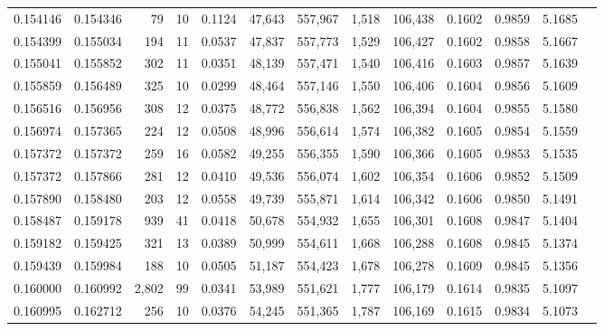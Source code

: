 \begin{tabular}{rrrrrrrrrrrrr}
0.154146 & 0.154346 &    79 &  10 &                                     0.1124 &  47,643 & 557,967 &   1,518 & 106,438 & 0.1602 & 0.9859 & 5.1685 \\
0.154399 & 0.155034 &   194 &  11 &                                     0.0537 &  47,837 & 557,773 &   1,529 & 106,427 & 0.1602 & 0.9858 & 5.1667 \\
0.155041 & 0.155852 &   302 &  11 &                                     0.0351 &  48,139 & 557,471 &   1,540 & 106,416 & 0.1603 & 0.9857 & 5.1639 \\
0.155859 & 0.156489 &   325 &  10 &                                     0.0299 &  48,464 & 557,146 &   1,550 & 106,406 & 0.1604 & 0.9856 & 5.1609 \\
0.156516 & 0.156956 &   308 &  12 &                                     0.0375 &  48,772 & 556,838 &   1,562 & 106,394 & 0.1604 & 0.9855 & 5.1580 \\
0.156974 & 0.157365 &   224 &  12 &                                     0.0508 &  48,996 & 556,614 &   1,574 & 106,382 & 0.1605 & 0.9854 & 5.1559 \\
0.157372 & 0.157372 &   259 &  16 &                                     0.0582 &  49,255 & 556,355 &   1,590 & 106,366 & 0.1605 & 0.9853 & 5.1535 \\
0.157372 & 0.157866 &   281 &  12 &                                     0.0410 &  49,536 & 556,074 &   1,602 & 106,354 & 0.1606 & 0.9852 & 5.1509 \\
0.157890 & 0.158480 &   203 &  12 &                                     0.0558 &  49,739 & 555,871 &   1,614 & 106,342 & 0.1606 & 0.9850 & 5.1491 \\
0.158487 & 0.159178 &   939 &  41 &                                     0.0418 &  50,678 & 554,932 &   1,655 & 106,301 & 0.1608 & 0.9847 & 5.1404 \\
0.159182 & 0.159425 &   321 &  13 &                                     0.0389 &  50,999 & 554,611 &   1,668 & 106,288 & 0.1608 & 0.9845 & 5.1374 \\
0.159439 & 0.159984 &   188 &  10 &                                     0.0505 &  51,187 & 554,423 &   1,678 & 106,278 & 0.1609 & 0.9845 & 5.1356 \\
0.160000 & 0.160992 & 2,802 &  99 &                                     0.0341 &  53,989 & 551,621 &   1,777 & 106,179 & 0.1614 & 0.9835 & 5.1097 \\
0.160995 & 0.162712 &   256 &  10 &                                     0.0376 &  54,245 & 551,365 &   1,787 & 106,169 & 0.1615 & 0.9834 & 5.1073 \\

\end{tabular}
